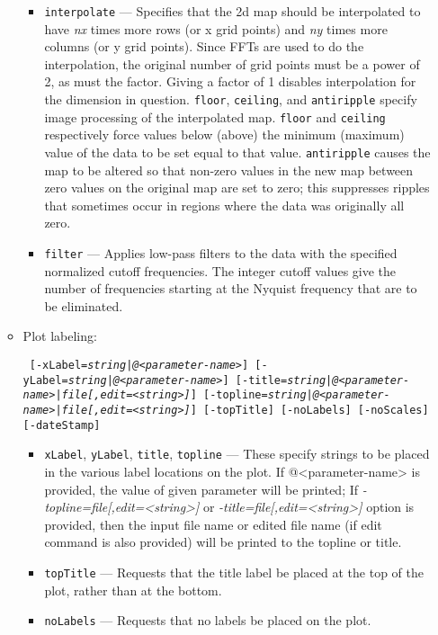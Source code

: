 \begin{itemize}
\begin{itemize}
\begin{itemize}
        \item \verb|interpolate| --- Specifies that the 2d map should be interpolated to have {\em nx} times
        more rows (or x grid points) and {\em ny} times more columns (or y grid points).  Since FFTs are used to
        do the interpolation, the original number of grid points must be a power of 2, as must the factor.  Giving
        a factor of 1 disables interpolation for the dimension in question.  \verb|floor|, \verb|ceiling|,
        and \verb|antiripple| specify image processing of the interpolated map.  \verb|floor| and \verb|ceiling|
        respectively force values below (above) the minimum (maximum) value of the data to be set equal to that
        value.  \verb|antiripple| causes the map to be altered so that non-zero values in the new map between
        zero values on the original map are set to zero; this suppresses ripples that sometimes occur in regions
        where the data was originally all zero.
        \item \verb|filter| --- Applies low-pass filters to the data with the specified normalized cutoff 
        frequencies.  The integer cutoff values give the number of frequencies starting at the Nyquist frequency
        that are to be eliminated.  
        \end{itemize}
    \item Plot labeling:
\begin{flushleft}{\tt
[-xLabel={\em string|@<parameter-name>}] [-yLabel={\em string|@<parameter-name>}] 
[-title={\em string|@<parameter-name>|file[,edit=<string>]}] [-topline={\em string|@<parameter-name>|file[,edit=<string>]}] 
[-topTitle] [-noLabels] [-noScales] [-dateStamp] 
}\end{flushleft}
        \begin{itemize}
        \item \verb|xLabel|, \verb|yLabel|, \verb|title|, \verb|topline| --- These specify strings to be placed
                in the various label locations on the plot. If @<parameter-name> is provided, the value of given parameter will be printed; If {\em-topline=file[,edit=<string>]} or {\em-title=file[,edit=<string>]} option is provided, then the input file name or edited file name (if edit command is also provided) will be printed to the topline or title.
        \item \verb|topTitle| --- Requests that the title label be placed at the top of the plot, rather than
                at the bottom.
        \item \verb|noLabels| --- Requests that no labels be placed on the plot.

\end{itemize}
\end{itemize}
\end{itemize}
